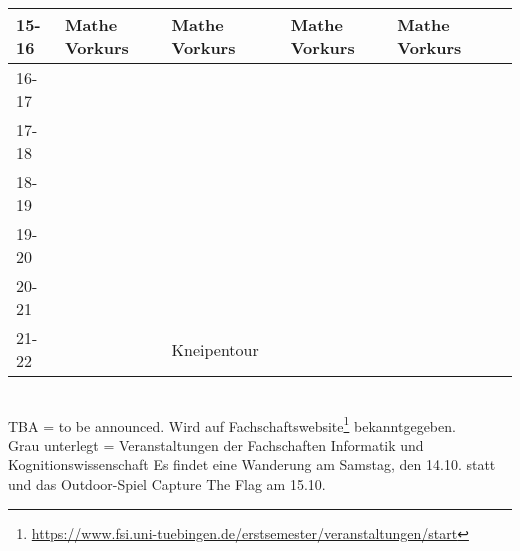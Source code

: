 \begin{table}[!h]
\begin{tabular}{|l|p{}|p{}|p{}|p{}|p{}|}
	15-16 & \multirow{-7}{*}{\footnotesize{Mathe Vorkurs}} & \multirow{-7}{*}{\footnotesize{Mathe Vorkurs}}                               & \multirow{-7}{*}{\footnotesize{Mathe Vorkurs}} & \multirow{-7}{*}{\footnotesize{Mathe Vorkurs}} &                         \\ \hline
	16-17 &                                 &                                                               &                                 &                                 &                         \\ \hline
	17-18 &                                 &                                                               &                                 &                                 &                         \\ \hline
	18-19 &                                 & \cellcolor[HTML]{EFEFEF}                                      &                                 &                                 & {\color[HTML]{FFFFFF} } \\ \cline{1-2} \cline{4-6} 
	19-20 &                                 & \cellcolor[HTML]{EFEFEF}                                      &                                 &                                 & {\color[HTML]{FFFFFF} } \\ \cline{1-2} \cline{4-6} 
	20-21 &                                 & \cellcolor[HTML]{EFEFEF}                                      &                                 &                                 & {\color[HTML]{FFFFFF} } \\ \cline{1-2} \cline{4-6} 
	21-22 &                                 & \multirow{-4}{*}{\cellcolor[HTML]{EFEFEF}\footnotesize{Kneipentour}} &                                 &                                 & {\color[HTML]{FFFFFF} } \\ \hline
	\end{tabular}
	\end{table}
\\
\scriptsize{TBA = to be announced. Wird auf Fachschaftswebsite\footnote{\url{https://www.fsi.uni-tuebingen.de/erstsemester/veranstaltungen/start}}  bekanntgegeben.} \\
\scriptsize{Grau unterlegt = Veranstaltungen der Fachschaften Informatik und Kognitionswissenschaft }
\scriptsize{Es findet eine Wanderung am Samstag, den 14.10. statt und das Outdoor-Spiel Capture The Flag am 15.10.}
\newpage


